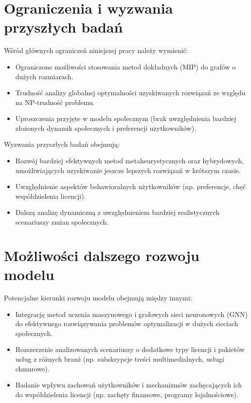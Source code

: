 \section{Ograniczenia i wyzwania przyszłych badań}

Wśród głównych ograniczeń niniejszej pracy należy wymienić:

\begin{itemize}
    \item Ograniczone możliwości stosowania metod dokładnych (MIP) do grafów o dużych rozmiarach.
    \item Trudność analizy globalnej optymalności uzyskiwanych rozwiązań ze względu na NP-trudność problemu.
    \item Uproszczenia przyjęte w modelu społecznym (brak uwzględnienia bardziej złożonych dynamik społecznych i preferencji użytkowników).
\end{itemize}

Wyzwania przyszłych badań obejmują:

\begin{itemize}
    \item Rozwój bardziej efektywnych metod metaheurystycznych oraz hybrydowych, umożliwiających uzyskiwanie jeszcze lepszych rozwiązań w krótszym czasie.
    \item Uwzględnienie aspektów behawioralnych użytkowników (np. preferencje, chęć współdzielenia licencji).
    \item Dalszą analizę dynamiczną z uwzględnieniem bardziej realistycznych scenariuszy zmian społecznych.
\end{itemize}

\section{Możliwości dalszego rozwoju modelu}

Potencjalne kierunki rozwoju modelu obejmują między innymi:

\begin{itemize}
    \item Integrację metod uczenia maszynowego i grafowych sieci neuronowych (GNN) do efektywnego rozwiązywania problemów optymalizacji w dużych sieciach społecznych.
    \item Rozszerzenie analizowanych scenariuszy o dodatkowe typy licencji i pakietów usług z różnych branż (np. subskrypcje treści multimedialnych, usługi chmurowe).
    \item Badanie wpływu zachowań użytkowników i mechanizmów zachęcających ich do współdzielenia licencji (np. zachęty finansowe, programy lojalnościowe).
\end{itemize}

